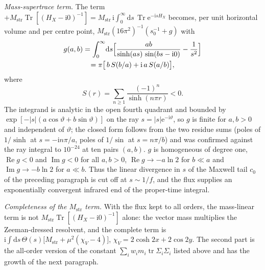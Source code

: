 \emph{Mass-supertrace term.} The term
\( +M_{\mathrm{str}}\operatorname{Tr}[(H_X-\mathrm i0)^{-1}]
= M_{\mathrm{str}}\,\mathrm i\!\int_0^\infty\!\mathrm ds\,\operatorname{Tr}\mathrm e^{-\mathrm isH_X} \)
becomes, per unit horizontal volume and per centre point,
\( M_{\mathrm{str}}(16\pi^2)^{-1}(s_0^{-1}+g) \) with
\begin{multline}
g(a,b)
=\int_0^\infty\!\mathrm ds
\Bigl[\frac{ab}{\sinh(as)\,\sin(bs-\mathrm i0)}-\frac1{s^2}\Bigr]
\\
=\pi\bigl[\,b\,S(b/a)+\mathrm i\,a\,S(a/b)\bigr],
\end{multline}
where
\[
S(r)=\sum_{n\ge1}\frac{(-1)^n}{\sinh(n\pi r)}<0.
\]
The integrand is analytic in the open fourth quadrant and bounded by \(\exp[-|s|(a\cos\vartheta+b\sin\vartheta)]\) on the ray \(s=|s|\mathrm e^{-\mathrm i\vartheta}\), so \(g\) is finite for \(a,b>0\) and independent of \(\vartheta\); the closed form follows from the two residue sums (poles of \(1/\sinh\) at \(s=-\mathrm in\pi/a\), poles of \(1/\sin\) at \(s=n\pi/b\)) and was confirmed against the ray integral to \(10^{-24}\) at ten pairs \((a,b)\). \(g\) is homogeneous of degree one, \(\operatorname{Re}g<0\) and \(\operatorname{Im}g<0\) for all \(a,b>0\), \(\operatorname{Re}g\to-a\ln2\) for \(b\ll a\) and \(\operatorname{Im}g\to-b\ln2\) for \(a\ll b\). Thus the linear divergence in \(s\) of the Maxwell tail \(c_0\) of the preceding paragraph is cut off at \(s\sim1/f\), and the flux supplies an exponentially convergent infrared end of the proper-time integral.

\emph{Completeness of the \(M_{\mathrm{str}}\) term.} With the flux kept to all orders, the mass-linear term is not \(M_{\mathrm{str}}\operatorname{Tr}[(H_X-\mathrm i0)^{-1}]\) alone: the vector mass multiplies the Zeeman-dressed resolvent, and the complete term is \(\mathrm i\!\int\!\mathrm ds\,\Theta(s)\bigl[M_{\mathrm{str}}+\mu^2(\chi_V-4)\bigr]\), \(\chi_V=2\cosh2x+2\cos2y\). The second part is the all-order version of the constant \(\sum_iw_im_i\operatorname{tr}\Sigma_i\Sigma_i\) listed above and has the growth of the next paragraph.

